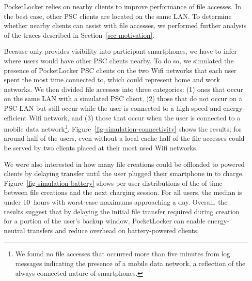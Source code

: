 PocketLocker relies on nearby clients to improve performance of file
accesses. In the best case, other PSC clients are located on the same LAN. To
determine whether nearby clients can assist with file accesses, we performed further
analysis of the traces described in Section~\ref{sec-motivation}.

Because \PhoneLab{} only provides visibility into participant smartphones, we
have to infer where users would have other PSC clients nearby. To do so, we
simulated the presence of PocketLocker PSC clients on the two Wifi networks
that each user spent the most time connected to, which could represent home
and work networks. We then divided file accesses into three categories: (1)
ones that occur on the same LAN with a simulated PSC client, (2) those that
do not occur on a PSC LAN but still occur while the user is connected to a
high-speed and energy-efficient Wifi network, and (3) those that occur when
the user is connected to a mobile data network\footnote{We found no file
  accesses that occurred more than five minutes from log messages indicating
  the presence of a mobile data network, a reflection of the always-connected
nature of smartphones.}. Figure~\ref{fig-simulation-connectivity} shows the
results; for around half of the users, even without a local cache half of the
file accesses could be served by two clients placed at their most
used Wifi networks. 

We were also interested in how many file creations could be offloaded to
powered clients by delaying transfer until the user plugged their smartphone
in to charge. Figure~\ref{fig-simulation-battery} shows per-user
distributions of the of time between file creations and the next charging
session. For all users, the median is under 10~hours with worst-case maximums
approaching a day. Overall, the results suggest that by delaying the initial
file transfer required during creation for a portion of the user's backup
window, PocketLocker can enable energy-neutral transfers and reduce overhead
on battery-powered clients.

